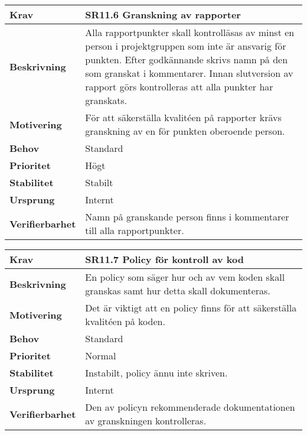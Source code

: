 \documentclass[a4paper, twoside, 11pt, titlepage]{article}
\begin{document}
\begin{tabular} { p{2.6cm} p{12.5cm} }
	\hline
	\sffamily\textbf{Krav} & \sffamily\textbf{SR11.6 Granskning av rapporter  } \\
	\hline
	\sffamily\textbf{Beskrivning} &  Alla rapportpunkter skall kontrolläsas av minst en person i projektgruppen som inte är ansvarig för punkten. Efter godkännande skrivs namn på den som granskat i kommentarer. Innan slutversion av rapport görs kontrolleras att alla punkter har granskats.   \\
	\hline
	\sffamily\textbf{Motivering} &  För att säkerställa kvalitéen på rapporter krävs granskning av en för punkten oberoende person.   \\
	\hline
	\sffamily\textbf{Behov} &  Standard   \\
	\hline
	\sffamily\textbf{Prioritet} &  Högt  \\
	\hline
	\sffamily\textbf{Stabilitet} &  Stabilt  \\
	\hline
	\sffamily\textbf{Ursprung} &  Internt   \\
	\hline
	\sffamily\textbf{Verifierbarhet} &  Namn på granskande person finns i kommentarer till alla rapportpunkter.   \\
	\hline
\end{tabular}
\vspace{6mm}

\begin{tabular} { p{2.6cm} p{12.5cm} }
	\hline
	\sffamily\textbf{Krav} & \sffamily\textbf{SR11.7 Policy för kontroll av kod  } \\
	\hline
	\sffamily\textbf{Beskrivning} &  En policy som säger hur och av vem koden skall granskas samt hur detta skall dokumenteras.   \\
	\hline
	\sffamily\textbf{Motivering} &  Det är viktigt att en policy finns för att säkerställa kvalitéen på koden.   \\
	\hline
	\sffamily\textbf{Behov} &  Standard   \\
	\hline
	\sffamily\textbf{Prioritet} &  Normal   \\
	\hline
	\sffamily\textbf{Stabilitet} &  Instabilt, policy ännu inte skriven.   \\
	\hline
	\sffamily\textbf{Ursprung} &  Internt   \\
	\hline
	\sffamily\textbf{Verifierbarhet} &  Den av policyn rekommenderade dokumentationen av granskningen kontrolleras.   \\
	\hline
\end{tabular}
\end{document}
